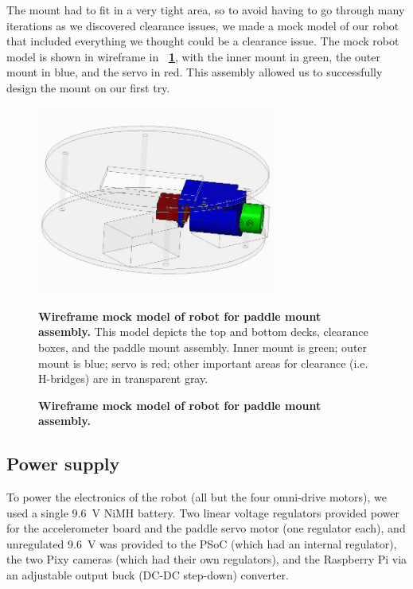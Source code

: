 \documentclass[letterpaper, 11pt]{article}
\newcommand*{\figref}[1]{\textbf{\figurename~\ref{#1}}}
\begin{document}
\begin{enumerate}[label=\textbf{\arabic*.}]
The mount had to fit in a very tight area, so to avoid having to go through many iterations as we discovered clearance issues, we made a mock model of our robot that included everything we thought could be a clearance issue. The mock robot model is shown in wireframe in \figref{fig:mock}, with the inner mount in green, the outer mount in blue, and the servo in red. This assembly allowed us to successfully design the mount on our first try.

\begin{figure}[ht]
    \centering
    \includegraphics[width=0.7\textwidth]{images/test-assembly.png}
    \caption{\textbf{Wireframe mock model of robot for paddle mount assembly.} This model depicts the top and bottom decks, clearance boxes, and the paddle mount assembly. Inner mount is green; outer mount is blue; servo is red; other important areas for clearance (i.e. H-bridges) are in transparent gray.}
    \caption{\textbf{Wireframe mock model of robot for paddle mount assembly.}}
    \label{fig:mock}
\end{figure}

\subsection{Power supply}
\label{sec:power}
To power the electronics of the robot (all but the four omni-drive motors), we used a single \SI{9.6}{V} NiMH battery. Two linear voltage regulators provided power for the accelerometer board and the paddle servo motor (one regulator each), and unregulated \SI{9.6}{V} was provided to the PSoC (which had an internal regulator), the two Pixy cameras (which had their own regulators), and the Raspberry Pi via an adjustable output buck (DC-DC step-down) converter.


\end{enumerate}
\end{document}
